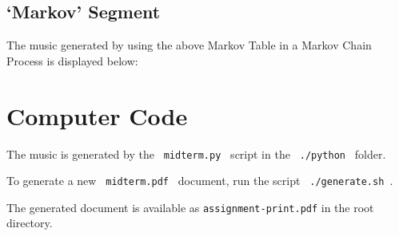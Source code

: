 \documentclass[10pt,letterpaper]{article}
\newcommand{\code}[1]{\colorbox{light-gray}{\texttt{#1}}}
\begin{document}
\vspace*{24pt}







\restoregeometry{}

\subsection*{`Markov' Segment}
The music generated by using the above Markov Table in a Markov Chain Process
is displayed below:


\clearpage{}

\section*{Computer Code}
The music is generated by the \code{ midterm.py } script in the
\code{ ./python } folder.

To generate a new \code{ midterm.pdf } document, run the script
\code{ ./generate.sh  }.

The generated document is available as \code{assignment-print.pdf} in the
root directory.
\end{document}
